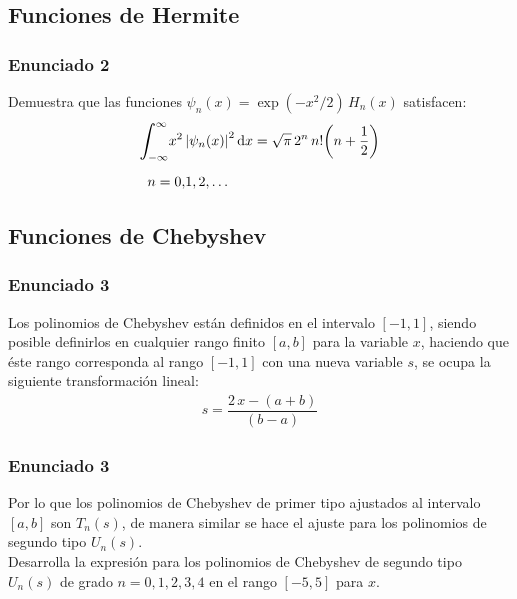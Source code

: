 \documentclass[12pt]{beamer}
\begin{document}
\subsection{Funciones de Hermite}

\begin{frame}
\frametitle{Enunciado 2}
Demuestra que las funciones $\psi_{n} (x) = \exp(-x^{2}/2) \, H_{n} (x)$ satisfacen:
\pause
\begin{align*}
\scaleint{6ex}_{\bs -\infty}^{\infty} x^{2} \, &\abs{\psi_{n} (x)}^{2} \dd{x} = \sqrt{\pi} \, 2^{n} \, n! \bigg( n + \dfrac{1}{2} \bigg) \\[0.5em]
 n = 0, &1, 2, \ldots
\end{align*}
\end{frame}

\subsection{Funciones de Chebyshev}

\begin{frame}
\frametitle{Enunciado 3}
Los polinomios de Chebyshev están definidos en el intervalo $[- 1, 1]$, siendo posible definirlos en cualquier rango finito $[a, b]$ para la variable $x$, haciendo que éste rango corresponda al rango $[-1, 1]$ con una nueva variable $s$, se ocupa la siguiente transformación lineal:
\pause
\begin{align*}
s = \dfrac{2 \, x - (a + b)}{(b - a)}
\end{align*}
\end{frame}
\begin{frame}
\frametitle{Enunciado 3}    
Por lo que los polinomios de Chebyshev de primer tipo ajustados al intervalo $[a, b]$ son $T_{n}(s)$, de manera similar se hace el ajuste para los polinomios de segundo tipo  $U_{n} (s)$. 
\\
\bigskip
\pause
Desarrolla la expresión para los polinomios de Chebyshev de segundo tipo $U_{n} (s)$ de grado $n = 0, 1, 2, 3, 4$ en el rango $[-5, 5]$ para $x$.
\end{frame}
\end{document}
